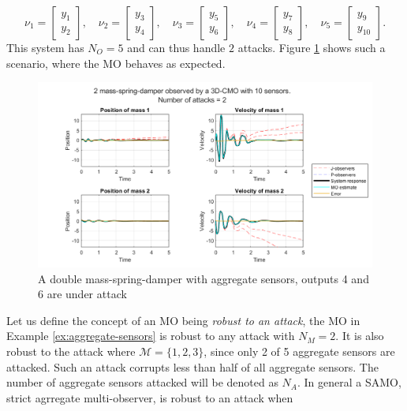 \begin{example}
    \begin{equation*}
        \nu_1 = 
        \begin{bmatrix}
            y_1 \\ y_2
        \end{bmatrix}, \quad
        \nu_2 = 
        \begin{bmatrix}
            y_3 \\ y_4
        \end{bmatrix}, \quad
        \nu_3 = 
        \begin{bmatrix}
            y_5 \\ y_6
        \end{bmatrix}, \quad
        \nu_4 =
        \begin{bmatrix}
            y_7 \\ y_8
        \end{bmatrix}, \quad
        \nu_5 = 
        \begin{bmatrix}
            y_9 \\ y_{10}
        \end{bmatrix}.
    \end{equation*}
    This system has $N_O=5$ and can thus handle $2$ attacks. Figure \ref{fig:aggregate-functional} shows such a scenario, where the MO behaves as expected.

    \begin{figure}[H]
        \centering
        \includegraphics[width=\linewidth]{report/Figures/aggregate-nonlinear-10o2a.png}
        \caption{A double mass-spring-damper with aggregate sensors, outputs 4 and 6 are under attack}
        \label{fig:aggregate-functional}
    \end{figure}
    
\end{example}
Let us define the concept of an MO being \textit{robust to an attack}, the MO in Example \ref{ex:aggregate-sensors} is robust to any attack with $N_M=2$. It is also robust to the attack where $\mathcal{M}=\{1,2,3\}$, since only 2 of 5 aggregate sensors are attacked. Such an attack corrupts less than half of all aggregate sensors. The number of aggregate sensors attacked will be denoted as $N_A$. In general a SAMO, strict agrregate multi-observer, is robust to an attack when
